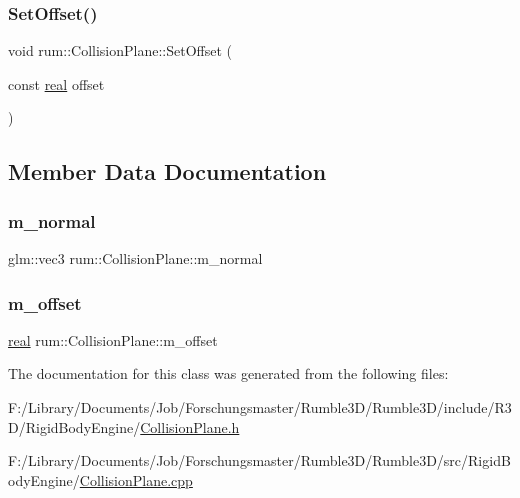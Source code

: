 \mbox{\label{classrum_1_1_collision_plane_a875e1d5f35d8dd71dcbcb8a0d8dc9b8e}} 
\subsubsection{\texorpdfstring{Set\+Offset()}{SetOffset()}}
{\footnotesize\ttfamily void rum\+::\+Collision\+Plane\+::\+Set\+Offset (\begin{DoxyParamCaption}\item[{const \hyperlink{namespacerum_a7e8cca23573d5eaead0f138cbaa4862c}{real}}]{offset }\end{DoxyParamCaption})}



\subsection{Member Data Documentation}
\mbox{\label{classrum_1_1_collision_plane_aa2f3d73f116cb6965cd561f25ea4b67e}} 
\subsubsection{\texorpdfstring{m\+\_\+normal}{m\_normal}}
{\footnotesize\ttfamily glm\+::vec3 rum\+::\+Collision\+Plane\+::m\+\_\+normal\hspace{0.3cm}{\ttfamily [protected]}}

\mbox{\label{classrum_1_1_collision_plane_a0630544f46ad1830d7f73f94746f1f25}} 
\subsubsection{\texorpdfstring{m\+\_\+offset}{m\_offset}}
{\footnotesize\ttfamily \hyperlink{namespacerum_a7e8cca23573d5eaead0f138cbaa4862c}{real} rum\+::\+Collision\+Plane\+::m\+\_\+offset\hspace{0.3cm}{\ttfamily [protected]}}



The documentation for this class was generated from the following files\+:\begin{DoxyCompactItemize}
\item 
F\+:/\+Library/\+Documents/\+Job/\+Forschungsmaster/\+Rumble3\+D/\+Rumble3\+D/include/\+R3\+D/\+Rigid\+Body\+Engine/\hyperlink{_collision_plane_8h}{Collision\+Plane.\+h}\item 
F\+:/\+Library/\+Documents/\+Job/\+Forschungsmaster/\+Rumble3\+D/\+Rumble3\+D/src/\+Rigid\+Body\+Engine/\hyperlink{_collision_plane_8cpp}{Collision\+Plane.\+cpp}\end{DoxyCompactItemize}
